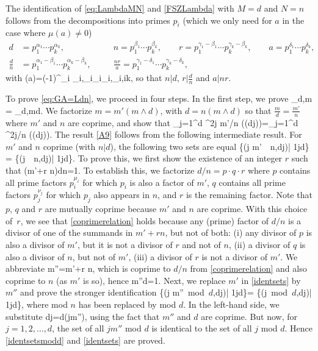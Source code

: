 \documentclass[11pt]{article}
\numberwithin{equation}{section}
\theoremstyle{definition}
\numberwithin{equation}{section}
\renewcommand{\le}{\leqslant}
\def\GA#1#2{\Gamma_{#2,#1}}
\begin{document}
The identification of \eqref{eq:LambdaMN} and \eqref{FSZLambda} with $M=d$ and $N=n$ follows from the decompositions into primes $p_i$ (which we only need for $a$ in the case where $\mu(a)\not=0$)
\begin{subequations}
\begin{alignat}{3}
d&=p_1^{\alpha_1}\cdots p_k^{\alpha_k},\quad 
&&n=p_1^{\beta_1}\cdots p_k^{\beta_k},\qquad
r=p_1^{\gamma_1-\beta_1}\cdots p_k^{\gamma_k-\beta_k},\qquad a=p_1^{\delta_1}\cdots p_k^{\delta_k},\\[0.2cm]
\tfrac dn&=p_1^{\alpha_1-\beta_1}\cdots p_k^{\alpha_k-\beta_k},\quad 
&&\tfrac{nr}a=p_1^{\gamma_1-\delta_1}\cdots p_k^{\gamma_k-\delta_k},
\end{alignat}
\end{subequations}
with
\be
\mu(a)=(-1)^{\sum_i \delta_i},\qquad \beta_i\le\gamma_i\le\alpha_i,\le\delta_i\le\min[\gamma_i,1],\le i\le k,
\ee
so that $n|d$, $r|\tfrac d n$ and $a|n r$.

To prove \eqref{eq:GA=Ldn}, we proceed in four steps. In the first step, we prove
\be
\GA{m}{d} = \GA{m\wedge d}{d}.\label{mostimportant}
\ee
We factorize $m={m'}(m\wedge d)$, with $d={n}(m\wedge d)$ so that $\tfrac md=\tfrac{m'}n$ where $m'$ and $n$ are coprime, and show that
\be
\sum_{j=1}^d  \eE^{2\ir \pi j m'/n} \cos\big(({d\wedge j})\gamma\big)=\sum_{j=1}^d  \eE^{2\ir \pi j/n} \cos\big(({d\wedge j})\gamma\big).\label{A9}
\ee
The result \eqref{A9} follows from the following intermediate result. For $m'$ and $n$ coprime (with $n|d$), the following two sets are equal
\be
\big\{\big(j m'\ \ n,d\wedge j\big)\big| 1\le j\le d\big\} = \big\{(j\ \ n,d\wedge j)\big| 1\le j\le d\big\}.\label{identsets}
\ee
To prove this, we first show the existence of an integer $r$ such that
\be
\left(m'+r n\right)\wedge\frac dn=1.
\label{coprimerelation}
\ee
To establish this, we factorize $d/n=p\cdot q\cdot r$ where $p$ contains all prime factors $p_i^{\mu_i}$ for which $p_i$ is also a factor of $m'$, $q$ contains all prime factors $p_j^{\nu_j}$ for which $p_j$ also appears in $n$, and $r$ is the remaining factor. Note
that $p$, $q$ and $r$ are mutually 
coprime because $m'$ and $n$ are coprime. With this choice of~$r$, we see that
\eqref{coprimerelation} holds because any (prime) factor of $d/n$
is a divisor of one of the summands in $m'+rn$, but not of both:
(i) any divisor of $p$ is also a divisor of $m'$, but it is not a divisor of 
$r$ and not of $n$,
(ii) a divisor of $q$ is also a divisor of $n$, but not of $m'$,
(iii) a divisor of $r$ is not a divisor of $m'$.
We abbreviate
\be
m''=m'+r n,
\ee
which is coprime to $d/n$ from \eqref{coprimerelation} and also coprime to $n$ (as
$m'$ is so),
hence
\be
m''\wedge d=1.
\ee
Next, we replace $m'$ in \eqref{identsets} by $m''$ and prove the stronger identification
\be
\{\big(j m''\ \mbox{mod $d$},d\wedge j\big)\big| 1\le j\le d\}= \{(j\ \mbox{mod $d$},d\wedge j)\big| 1\le j\le d\},\label{identsetsmodd}
\ee
where mod $n$ has been replaced by mod $d$. In the left-hand side, we substitute
\be
d\wedge j=d\wedge (jm''),
\ee
using the fact that $m''$ and $d$ are coprime. But now, for $j=1, 2,\dots,d$, the set of all $jm''$ mod $d$ is identical to the set of all $j$ mod $d$. Hence
\eqref{identsetsmodd} and \eqref{identsets} are proved.
\end{document}
